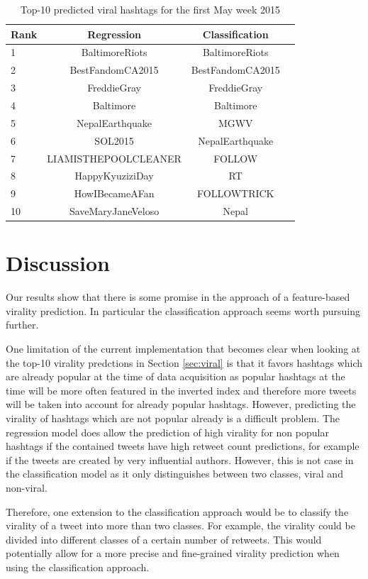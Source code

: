 \begin{table}[h]
\centering
\begin{tabular}{ l | c |c |c}
\textbf{Rank} & \textbf{Regression} &
\textbf{Classification}  \\\hline
1  &  BaltimoreRiots  &  BaltimoreRiots \\
2  &  BestFandomCA2015  &  BestFandomCA2015 \\
3  &  FreddieGray  &  FreddieGray \\
4  &  Baltimore  &  Baltimore \\
5  &  NepalEarthquake  & MGWV \\
6  &  SOL2015  & NepalEarthquake  \\
7  &  LIAMISTHEPOOLCLEANER  &  FOLLOW \\
8  &  HappyKyuziziDay  &  RT \\
9  &  HowIBecameAFan  &  FOLLOWTRICK \\
10  & SaveMaryJaneVeloso   &  Nepal
\end{tabular}
\caption{Top-10 predicted viral hashtags for the first May week 2015}
\label{tab:results}
\end{table}


\section{Discussion}

Our results show that there is some promise in the approach of a feature-based virality prediction. In particular the classification approach seems worth pursuing further. 

One limitation of the current implementation that becomes clear when looking at the top-10 virality predctions in Section \ref{sec:viral} is that it favors hashtags which are already popular at the time of data acquisition as popular hashtags at the time will be more often featured in the inverted index and therefore more tweets will be taken into account for already popular hashtags. However, predicting the virality of hashtags which are not popular already is a difficult problem. The regression model does allow the prediction of high virality for non popular hashtags if the contained tweets have high retweet count predictions, for example if the tweets are created by very influential authors. However, this is not case in the classification model as it only distinguishes between two classes, viral and non-viral. 

Therefore, one extension to the classification approach would be to classify the virality of a tweet into more than two classes. For example, the virality could be divided into different classes of a certain number of retweets. This would potentially allow for a more precise and fine-grained virality prediction when using the classification approach. 

